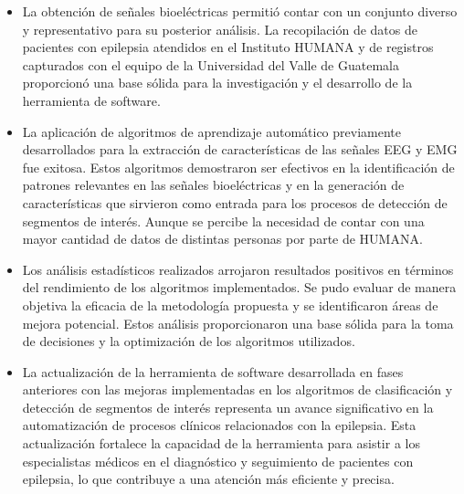 \begin{itemize}
    \item La obtención de señales bioeléctricas permitió contar con un conjunto diverso y representativo para su posterior análisis. La recopilación de datos de pacientes con epilepsia atendidos en el Instituto HUMANA y de registros capturados con el equipo de la Universidad del Valle de Guatemala proporcionó una base sólida para la investigación y el desarrollo de la herramienta de software.
    
    \item La aplicación de algoritmos de aprendizaje automático previamente desarrollados para la extracción de características de las señales EEG y EMG fue exitosa. Estos algoritmos demostraron ser efectivos en la identificación de patrones relevantes en las señales bioeléctricas y en la generación de características que sirvieron como entrada para los procesos de detección de segmentos de interés. Aunque se percibe la necesidad de contar con una mayor cantidad de datos de distintas personas por parte de HUMANA.
    
    
    \item Los análisis estadísticos realizados arrojaron resultados positivos en términos del rendimiento de los algoritmos implementados. Se pudo evaluar de manera objetiva la eficacia de la metodología propuesta y se identificaron áreas de mejora potencial. Estos análisis proporcionaron una base sólida para la toma de decisiones y la optimización de los algoritmos utilizados.
    
    \item La actualización de la herramienta de software desarrollada en fases anteriores con las mejoras implementadas en los algoritmos de clasificación y detección de segmentos de interés representa un avance significativo en la automatización de procesos clínicos relacionados con la epilepsia. Esta actualización fortalece la capacidad de la herramienta para asistir a los especialistas médicos en el diagnóstico y seguimiento de pacientes con epilepsia, lo que contribuye a una atención más eficiente y precisa.
\end{itemize}